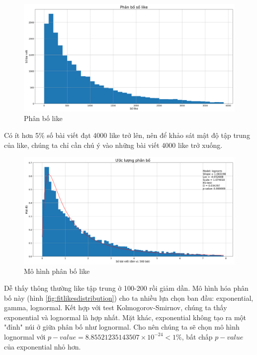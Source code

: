 \documentclass[10pt,a4paper]{article}
\begin{document}
\begin{figure}[!ht]
    \centering
    \includegraphics[width=\textwidth]{img/LikesDistribution.png}
    \caption{Phân bố like}
    \label{fig:likesdistribution}
\end{figure}

Có ít hơn 5\% số bài viết đạt 4000 like trở lên, nên để khảo sát mật độ tập trung của like, chúng ta chỉ cần chú ý vào những bài viết 4000 like trở xuống.

\begin{figure}[!h]
    \centering
    \includegraphics[width=\textwidth]{img/FitLikesDistribution.png}
    \caption{Mô hình phân bố like}
    \label{fig:fitlikesdistribution}
\end{figure}
Dễ thấy thông thường like tập trung ở 100-200 rồi giảm dần. Mô hình hóa phân bố này (hình \eqref{fig:fitlikesdistribution}) cho ta nhiều lựa chọn ban đầu: exponential, gamma, lognormal. Kết hợp với test Kolmogorov-Smirnov, chúng ta thấy exponential và lognormal là hợp nhất. Mặt khác, exponential không tạo ra một "đỉnh" núi ở giữa phân bố như lognormal. Cho nên chúng ta sẽ chọn mô hình lognormal với $p-value = 8.85521235143507 \times 10^{-24} < 1\%$, bất chấp $p-value$ của exponential nhỏ hơn.
\end{document}

